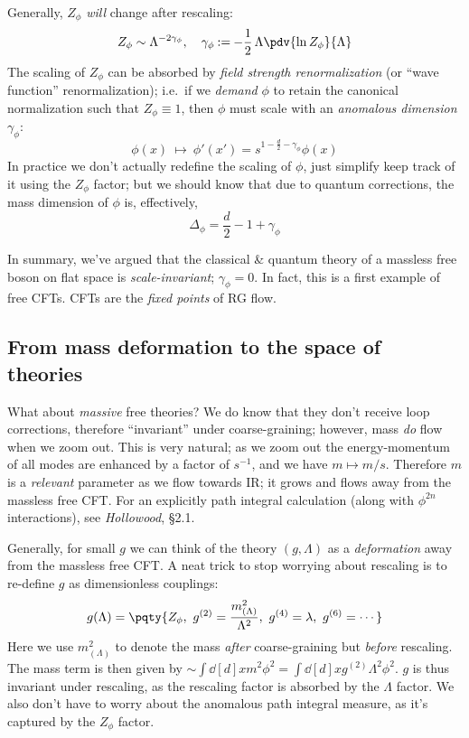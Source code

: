 \documentclass[a4paper
	,10pt
]{article}
\begin{document}
	Generally, $Z_\phi$ \textit{will} change after rescaling:
	\begin{equation}
		Z_\phi \sim \Lambda^{-2\gamma_\phi},
	\quad
		\gamma_\phi
		\mathbin{:=}
		-\frac{1}{2}\,\Lambda \pdv{\ln Z_\phi}{\Lambda}
	\end{equation}
	The scaling of $Z_\phi$ can be absorbed by \textit{field strength renormalization} (or ``wave function'' renormalization); i.e.\ if we \textit{demand} $\phi$ to retain the canonical normalization such that $Z_\phi \equiv 1$, then $\phi$ must scale with an \textit{anomalous dimension} $\gamma_\phi$:
	\begin{equation}
		\phi(x) 
		\ \longmapsto\ %
		\phi'(x') = s^{1 - \frac{d}{2} - \gamma_\phi} \phi(x)
	\end{equation}
	In practice we don't actually redefine the scaling of $\phi$, just simplify keep track of it using the $Z_\phi$ factor; but we should know that due to quantum corrections, the mass dimension of $\phi$ is, effectively,
	\begin{equation}
		\Delta_\phi
		= \frac{d}{2} - 1 + \gamma_\phi
	\end{equation}
	
	In summary, we've argued that the classical \& quantum theory of a massless free boson on flat space is \textit{scale-invariant}; $\gamma_\phi = 0$. In fact, this is a first example of free CFTs. 
	CFTs are the \textit{fixed points} of RG flow.
\subsection{From mass deformation to the space of theories}
	What about \textit{massive} free theories? We do know that they don't receive loop corrections, therefore ``invariant'' under coarse-graining; however, mass \textit{do} flow when we zoom out. This is very natural; as we zoom out the energy-momentum of all modes are enhanced by a factor of $s^{-1}$, and we have $m\mapsto m/s$. Therefore $m$ is a \textit{relevant} parameter as we flow towards IR; it grows and flows away from the massless free CFT. For an explicitly path integral calculation (along with $\phi^{2n}$ interactions), see \textit{Hollowood}, \S2.1. 
	
	Generally, for small $g$ we can think of the theory $(g,\Lambda)$ as a \textit{deformation} away from the massless free CFT. A neat trick to stop worrying about rescaling is to re-define $g$ as dimensionless couplings:
	\begin{equation}
		g(\Lambda) = \pqty{
			Z_\phi,
			\ g^{(2)} = \frac{m^2_{(\Lambda)}}{\Lambda^2},
			\ g^{(4)} = \lambda,
			\ g^{(6)} = \cdots
		}
	\end{equation}
	Here we use $m^2_{(\Lambda)}$ to denote the mass \textit{after} coarse-graining but \textit{before} rescaling. The mass term is then given by $
		\sim \int \dd[d]{x} m^2 \phi^2
		= \int \dd[d]{x} g^{(2)} \Lambda^2 \phi^2
	$. $g$ is thus invariant under rescaling, as the rescaling factor is absorbed by the $\Lambda$ factor. We also don't have to worry about the anomalous path integral measure, as it's captured by the $Z_\phi$ factor. 
	
\end{document}
